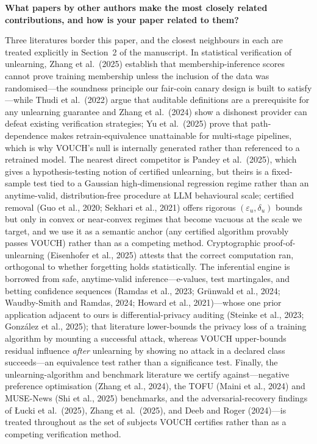 \documentclass[10pt]{article}
\newcommand{\eps}{\varepsilon}
\begin{document}
\vspace{2pt}
\noindent\textbf{What papers by other authors make the most closely related
contributions, and how is your paper related to them?}

Three literatures border this paper, and the closest neighbours in each are treated
explicitly in Section~2 of the manuscript. In statistical verification of unlearning,
Zhang et al.\ (2025) establish that membership-inference scores cannot prove
training membership unless the inclusion of the data was randomised---the soundness
principle our fair-coin canary design is built to satisfy---while Thudi et al.\
(2022) argue that auditable definitions are a prerequisite for any unlearning
guarantee and Zhang et al.\ (2024) show a dishonest provider can defeat existing
verification strategies; Yu et al.\ (2025) prove that path-dependence makes
retrain-equivalence unattainable for multi-stage pipelines, which is why VOUCH's
null is internally generated rather than referenced to a retrained model. The
nearest direct competitor is Pandey et al.\ (2025), which gives a hypothesis-testing
notion of certified unlearning, but theirs is a fixed-sample test tied to a Gaussian
high-dimensional regression regime rather than an anytime-valid, distribution-free
procedure at LLM behavioural scale; certified removal (Guo et al., 2020; Sekhari et
al., 2021) offers rigorous $(\eps_u,\delta_u)$ bounds but only in convex or
near-convex regimes that become vacuous at the scale we target, and we use it as a
semantic anchor (any certified algorithm provably passes VOUCH) rather than as a
competing method. Cryptographic proof-of-unlearning (Eisenhofer et al., 2025)
attests that the correct computation ran, orthogonal to whether forgetting holds
statistically. The inferential engine is borrowed from safe, anytime-valid
inference---e-values, test martingales, and betting confidence sequences (Ramdas et
al., 2023; Gr\"unwald et al., 2024; Waudby-Smith and Ramdas, 2024; Howard et al.,
2021)---whose one prior application adjacent to ours is differential-privacy
auditing (Steinke et al., 2023; Gonz\'alez et al., 2025); that literature
lower-bounds the privacy loss of a training algorithm by mounting a successful
attack, whereas VOUCH upper-bounds residual influence \emph{after} unlearning by
showing no attack in a declared class succeeds---an equivalence test rather than a
significance test. Finally, the unlearning-algorithm and benchmark literature we
certify against---negative preference optimisation (Zhang et al., 2024), the TOFU
(Maini et al., 2024) and MUSE-News (Shi et al., 2025) benchmarks, and the
adversarial-recovery findings of {\L}ucki et al.\ (2025), Zhang et al.\ (2025), and
Deeb and Roger (2024)---is treated throughout as the set of subjects VOUCH
certifies rather than as a competing verification method.
\end{document}
